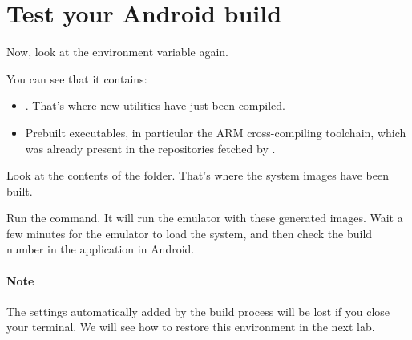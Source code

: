 \section{Test your Android build}

Now, look at the  environment variable again.

You can see that it contains:
\begin{itemize}
\item
  .
  That's where new utilities have just been compiled.
\item Prebuilt executables, in particular the ARM cross-compiling
  toolchain, which was already present in the repositories fetched by
  .
\end{itemize}

Look at the contents of the  folder.
That's where the system images have been built.

Run the  command. It will run the emulator with these
generated images.  Wait a few minutes for the emulator to load the
system, and then check the build number in the 
application in Android.

\paragraph{Note}
The  settings automatically added by the build process will
be lost if you close your terminal. We will see how to restore this
environment in the next lab.

